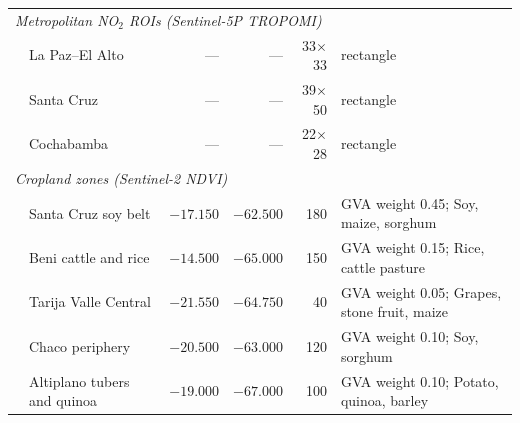 \begin{table}[H]
\begin{tabular}{llrrrl}
\midrule
\multicolumn{6}{l}{\textit{Metropolitan NO$_2$ ROIs (Sentinel-5P TROPOMI)}} \\
& La Paz–El Alto & --- & --- & 33$\times$33 & rectangle \\
& Santa Cruz & --- & --- & 39$\times$50 & rectangle \\
& Cochabamba & --- & --- & 22$\times$28 & rectangle \\
\midrule
\multicolumn{6}{l}{\textit{Cropland zones (Sentinel-2 NDVI)}} \\
& Santa Cruz soy belt & $-17.150$ & $-62.500$ & 180 & GVA weight 0.45; Soy, maize, sorghum \\
& Beni cattle and rice & $-14.500$ & $-65.000$ & 150 & GVA weight 0.15; Rice, cattle pasture \\
& Tarija Valle Central & $-21.550$ & $-64.750$ & 40 & GVA weight 0.05; Grapes, stone fruit, maize \\
& Chaco periphery & $-20.500$ & $-63.000$ & 120 & GVA weight 0.10; Soy, sorghum \\
& Altiplano tubers and quinoa & $-19.000$ & $-67.000$ & 100 & GVA weight 0.10; Potato, quinoa, barley \\
\bottomrule
\end{tabular}
\end{table}